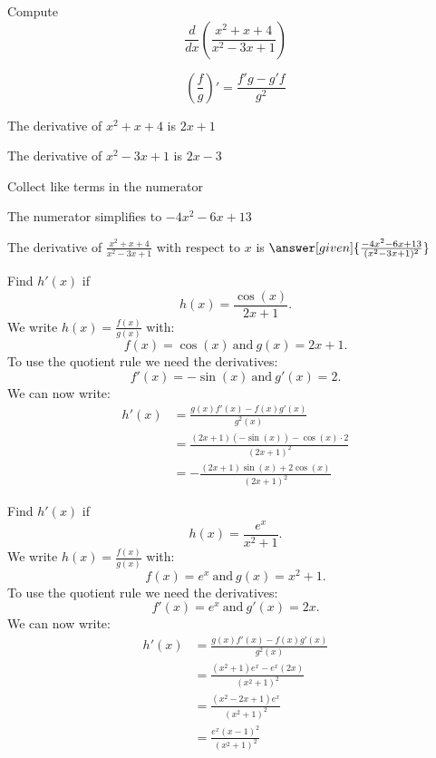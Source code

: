\documentclass{ximera}
\begin{document}
\begin{question} %
  Compute
  \[
  \frac{d}{dx} \left(\frac{x^2 + x + 4}{x^2 -3x + 1}\right)
  \]
  
    \begin{hint}
      \[\left(\frac{f}{g}\right)' = \frac{f'g-g'f}{g^2}\]
    \end{hint}
    \begin{hint}
      The derivative of $x^2 + x + 4$ is $2x+1$
    \end{hint}
    \begin{hint}
      The derivative of $x^2 -3x + 1$ is $2x-3$
    \end{hint}
    \begin{hint}
      Collect like terms in the numerator
    \end{hint}
		\begin{hint}
      The numerator simplifies to $-4x^2 -6x +13$
    \end{hint}
		The derivative of $\frac{x^2 + x + 4}{x^2 -3x + 1}$ with respect to $x$ is
		 $\answer[given]{\frac{-4x^2 -6x +13}{(x^2 -3x + 1)^2}}$
		
\end{question}



\begin{example} %
Find $h'(x)$ if 
\[
h(x) = \frac{\cos(x)}{2x+1}.
\]
We write $\displaystyle{h(x) = \frac{f(x)}{g(x)}}$ 
with: 
\[f(x) = \cos(x) \ \text{and} \  g(x)= 2x+1.\]
To use the quotient rule we need the derivatives:
\[f'(x) = -\sin(x) \ \text{and} \  g'(x) = 2.\]
We can now write: 
\begin{align*}
h'(x) &= \frac{g(x)f'(x) - f(x)g'(x)}{g^2(x)}\\
&= \frac{(2x+1)(-\sin(x))- \cos(x)\cdot 2}{(2x+1)^2}\\
&= -\frac{(2x+1)\sin(x) + 2\cos(x)}{(2x+1)^2}
\end{align*}
\end{example}



\begin{center}
\begin{foldable}
\end{foldable}
\end{center}



\begin{example} %
Find $h'(x)$ if
\[
h(x) = \frac{e^x}{x^2 + 1}.
\]
We write $\displaystyle{h(x) = \frac{f(x)}{g(x)}}$ 
with:
\[f(x) =e^x \ \text{and} \  g(x)= x^2 + 1.\]
To use the quotient rule we need the derivatives:
\[f'(x) = e^x \ \text{and} \  g'(x) =2x.\] 
We can now write: 
\begin{align*}
h'(x) &= \frac{g(x)f'(x) - f(x)g'(x)}{g^2(x)}\\
&= \frac{(x^2+1)e^x - e^x(2x)}{(x^2 + 1)^2} \\
&= \frac{(x^2 - 2x +1)e^x}{(x^2 + 1)^2} \\
&= \frac{e^x(x-1)^2}{(x^2 + 1)^2} 
\end{align*}
\end{example}
\end{document}
